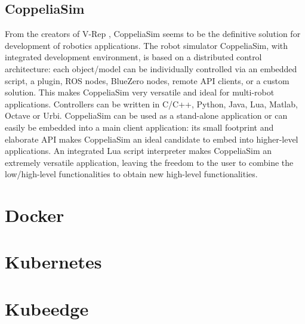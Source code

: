 
\subsection{CoppeliaSim}
From the creators of V-Rep \cite{VREP}, CoppeliaSim \cite{coppeliaSim} seems to be the definitive solution for development of robotics applications.
The robot simulator CoppeliaSim, with integrated development environment, is based on a distributed control architecture: each object/model can be individually controlled via an embedded script, a plugin, ROS nodes, BlueZero nodes, remote API clients, or a custom solution. This makes CoppeliaSim very versatile and ideal for multi-robot applications. Controllers can be written in C/C++, Python, Java, Lua, Matlab, Octave or Urbi.
CoppeliaSim can be used as a stand-alone application or can easily be embedded into a main client application: its small footprint and elaborate API makes CoppeliaSim an ideal candidate to embed into higher-level applications. An integrated Lua script interpreter makes CoppeliaSim an extremely versatile application, leaving the freedom to the user to combine the low/high-level functionalities to obtain new high-level functionalities.




\section{Docker} %




\section{Kubernetes} \label{kubernetesbackground} %



\section{Kubeedge} \label{kubeedgebackground} %
\clearpage
\thispagestyle{empty}
